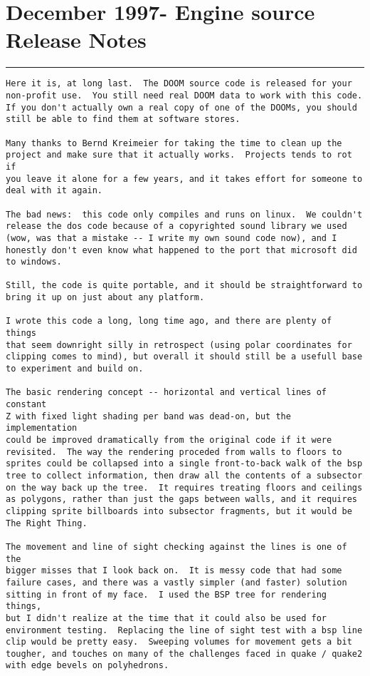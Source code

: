 \section{December 1997- Engine source Release Notes}
\hrule \par \bigskip
\begin{verbatim}
Here it is, at long last.  The DOOM source code is released for your
non-profit use.  You still need real DOOM data to work with this code.
If you don't actually own a real copy of one of the DOOMs, you should
still be able to find them at software stores.

Many thanks to Bernd Kreimeier for taking the time to clean up the
project and make sure that it actually works.  Projects tends to rot if
you leave it alone for a few years, and it takes effort for someone to
deal with it again.

The bad news:  this code only compiles and runs on linux.  We couldn't
release the dos code because of a copyrighted sound library we used
(wow, was that a mistake -- I write my own sound code now), and I
honestly don't even know what happened to the port that microsoft did
to windows.

Still, the code is quite portable, and it should be straightforward to
bring it up on just about any platform.

I wrote this code a long, long time ago, and there are plenty of things
that seem downright silly in retrospect (using polar coordinates for
clipping comes to mind), but overall it should still be a usefull base
to experiment and build on.

The basic rendering concept -- horizontal and vertical lines of constant
Z with fixed light shading per band was dead-on, but the implementation
could be improved dramatically from the original code if it were
revisited.  The way the rendering proceded from walls to floors to
sprites could be collapsed into a single front-to-back walk of the bsp
tree to collect information, then draw all the contents of a subsector
on the way back up the tree.  It requires treating floors and ceilings
as polygons, rather than just the gaps between walls, and it requires
clipping sprite billboards into subsector fragments, but it would be
The Right Thing.

The movement and line of sight checking against the lines is one of the
bigger misses that I look back on.  It is messy code that had some
failure cases, and there was a vastly simpler (and faster) solution
sitting in front of my face.  I used the BSP tree for rendering things,
but I didn't realize at the time that it could also be used for
environment testing.  Replacing the line of sight test with a bsp line
clip would be pretty easy.  Sweeping volumes for movement gets a bit
tougher, and touches on many of the challenges faced in quake / quake2
with edge bevels on polyhedrons.


\end{verbatim}
